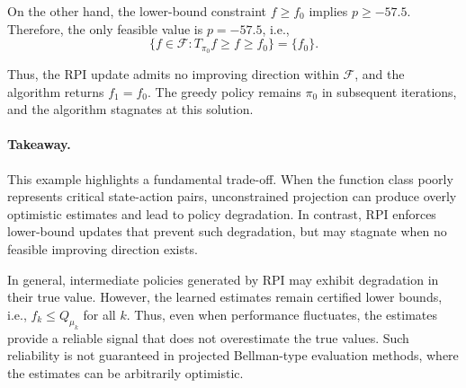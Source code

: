 \documentclass[twoside]{article}
\theoremstyle{plain}
\theoremstyle{definition}
\theoremstyle{remark}
\begin{document}
On the other hand, the lower-bound constraint $f \ge f_0$ implies $p \ge -57.5$. 
Therefore, the only feasible value is $p = -57.5$, i.e.,
\[
\{f \in \mathcal F : T_{\pi_0} f \ge f \ge f_0\} = \{f_0\}.
\]

Thus, the RPI update admits no improving direction within $\mathcal F$, and the algorithm returns $f_1 = f_0$. The greedy policy remains $\pi_0$ in subsequent iterations, and the algorithm stagnates at this solution.


\paragraph{Takeaway.}
This example highlights a fundamental trade-off. When the function class poorly represents critical state-action pairs, unconstrained projection can produce overly optimistic estimates and lead to policy degradation. In contrast, RPI enforces lower-bound updates that prevent such degradation, but may stagnate when no feasible improving direction exists. 

In general, intermediate policies generated by RPI may exhibit degradation in their true value. However, the learned estimates remain certified lower bounds, i.e., $f_k \le Q_{\mu_k}$ for all $k$. Thus, even when performance fluctuates, the estimates provide a reliable signal that does not overestimate the true values. Such reliability is not guaranteed in projected Bellman-type evaluation methods, where the estimates can be arbitrarily optimistic.
\end{document}
